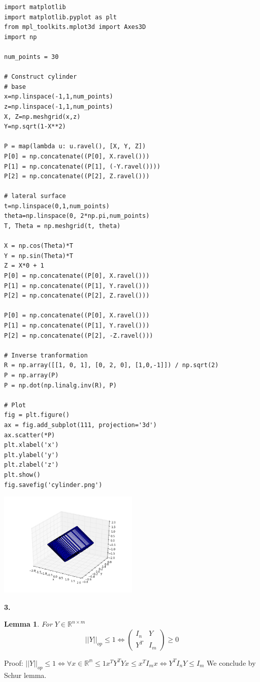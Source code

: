 \documentclass[11pt]{article}
\newtheorem{lemma}[theorem]{Lemma}
\begin{document}
\begin{verbatim}
import matplotlib
import matplotlib.pyplot as plt
from mpl_toolkits.mplot3d import Axes3D
import np

num_points = 30

# Construct cylinder
# base
x=np.linspace(-1,1,num_points)
z=np.linspace(-1,1,num_points)
X, Z=np.meshgrid(x,z)
Y=np.sqrt(1-X**2)

P = map(lambda u: u.ravel(), [X, Y, Z])
P[0] = np.concatenate((P[0], X.ravel()))
P[1] = np.concatenate((P[1], (-Y.ravel())))
P[2] = np.concatenate((P[2], Z.ravel()))

# lateral surface
t=np.linspace(0,1,num_points)
theta=np.linspace(0, 2*np.pi,num_points)
T, Theta = np.meshgrid(t, theta)

X = np.cos(Theta)*T
Y = np.sin(Theta)*T
Z = X*0 + 1
P[0] = np.concatenate((P[0], X.ravel()))
P[1] = np.concatenate((P[1], Y.ravel()))
P[2] = np.concatenate((P[2], Z.ravel()))

P[0] = np.concatenate((P[0], X.ravel()))
P[1] = np.concatenate((P[1], Y.ravel()))
P[2] = np.concatenate((P[2], -Z.ravel()))

# Inverse tranformation
R = np.array([[1, 0, 1], [0, 2, 0], [1,0,-1]]) / np.sqrt(2)
P = np.array(P)
P = np.dot(np.linalg.inv(R), P)

# Plot
fig = plt.figure()
ax = fig.add_subplot(111, projection='3d')
ax.scatter(*P)
plt.xlabel('x')
plt.ylabel('y')
plt.zlabel('z')
plt.show()
fig.savefig('cylinder.png')
\end{verbatim}

\begin{center}
\includegraphics[width=0.5\textwidth]{./cylinder.png}
\end{center}


\textbf{3.}
\begin{lemma}
For \(Y \in \mathbb R^{n\times m}\)
$$||Y||_{op} \le 1 \iff \begin{pmatrix}I_n&Y\\Y^T&I_m\end{pmatrix} \ge 0$$
\end{lemma}
Proof: \(||Y||_{op} \le 1 \iff \forall x \in \mathbb{R^m} \le 1 x^TY^TYx \le x^TI_mx \iff Y^TI_nY \le I_m\) We conclude by Schur lemma.
\end{document}

